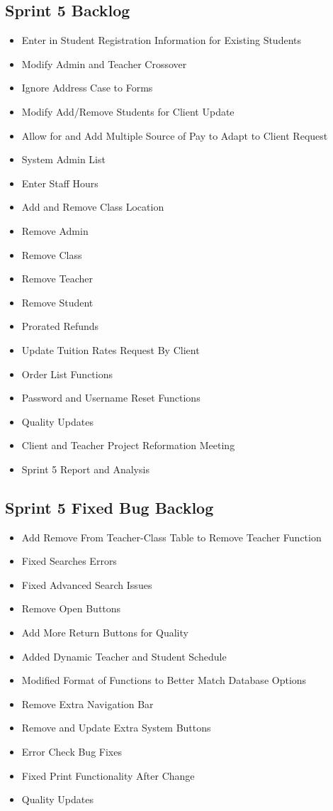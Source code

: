 \subsection{Sprint 5 Backlog}
\begin{itemize}
\item Enter in Student Registration Information for Existing Students
\item Modify Admin and Teacher Crossover 
\item Ignore Address Case to Forms 
\item Modify Add/Remove Students for Client Update
\item Allow for and Add Multiple Source of Pay to Adapt to Client Request 
\item System Admin List
\item Enter Staff Hours 
\item Add and Remove Class Location
\item Remove Admin
\item Remove Class
\item Remove Teacher
\item Remove Student
\item Prorated Refunds
\item Update Tuition Rates Request By Client
\item Order List Functions
\item Password and Username Reset Functions
\item Quality Updates
\item Client and Teacher Project Reformation Meeting
\item Sprint 5 Report and Analysis 
\end{itemize}

\subsection{Sprint 5 Fixed Bug Backlog}
\begin{itemize}
\item Add Remove From Teacher-Class Table to Remove Teacher Function
\item Fixed Searches Errors
\item Fixed Advanced Search Issues 
\item Remove Open Buttons
\item Add More Return Buttons for Quality 
\item Added Dynamic Teacher and Student Schedule
\item Modified Format of Functions to Better Match Database Options 
\item Remove Extra Navigation Bar
\item Remove and Update Extra System Buttons
\item Error Check Bug Fixes
\item Fixed Print Functionality After Change
\item Quality Updates 
\end{itemize}


